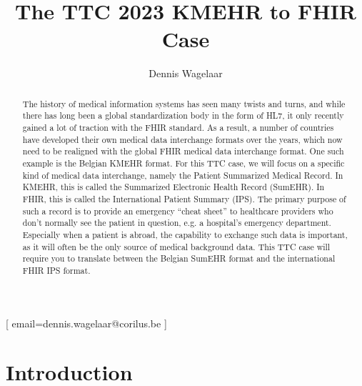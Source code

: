 \documentclass[
twocolumn,
]{ceurart}
\begin{document}


\title{The TTC 2023 KMEHR to FHIR Case}
\author[1]{Dennis Wagelaar}[%
email=dennis.wagelaar@corilus.be
]
\address[1]{  Corilus nv,
  Gaston Crommenlaan 4, 9050 Gent}

\maketitle

\begin{abstract}
The history of medical information systems has seen many twists and turns, and 
while there has long been a global standardization body in the form of HL7, it 
only recently gained a lot of traction with the FHIR standard. As a result, a 
number of countries have developed their own medical data interchange formats 
over the years, which now need to be realigned with the global FHIR medical 
data interchange format. One such example is the Belgian KMEHR format. 
For this TTC case, we will focus on a specific kind of medical data 
interchange, namely the Patient Summarized Medical Record. In KMEHR, this is 
called the Summarized Electronic Health Record (SumEHR). In FHIR, this is 
called the International Patient Summary (IPS). The primary purpose of such a 
record is to provide an emergency ``cheat sheet'' to healthcare providers who 
don't normally see the patient in question, e.g. a hospital's emergency 
department. Especially when a patient is abroad, the capability to exchange 
such data is important, as it will often be the only source of medical 
background data. This TTC case will require you to translate between the 
Belgian SumEHR format and the international FHIR IPS format.
\end{abstract}

\section{Introduction}
\end{document}
